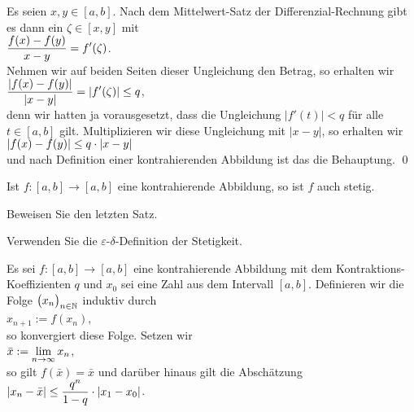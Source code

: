 \proof
Es seien $x, y \in [a,b]$.
Nach dem Mittelwert-Satz der Differenzial-Rechnung gibt es dann ein $\zeta\in[x,y]$ mit 
\\[0.2cm]
\hspace*{1.3cm}
$\displaystyle\frac{f(x) - f(y)}{x - y} = f'(\zeta)$.
\\[0.2cm]
Nehmen wir auf beiden Seiten dieser Ungleichung den Betrag, so erhalten wir
\\[0.2cm]
\hspace*{1.3cm}
$\displaystyle\frac{|f(x) - f(y)|}{|x - y|} = |f'(\zeta)| \leq q$,
\\[0.2cm]
denn wir hatten ja vorausgesetzt, dass die Ungleichung $|f'(t)| < q$ f\"ur alle
$t \in [a,b]$ gilt.  Multiplizieren wir diese Ungleichung mit $|x - y|$, so erhalten wir
\\[0.2cm]
\hspace*{1.3cm}
$\displaystyle |f(x) - f(y)| \leq q \cdot |x  - y|$
\\[0.2cm]
und nach Definition einer kontrahierenden Abbildung ist das die Behauptung.
\qed

\begin{Satz}
  Ist $f:[a,b] \rightarrow [a,b]$ eine kontrahierende Abbildung, so ist $f$ auch stetig.
\end{Satz}

\exercise
Beweisen Sie den letzten Satz.

\hint
Verwenden Sie die $\varepsilon$-$\delta$-Definition der Stetigkeit.
\eox

\begin{Satz} \lb
Es sei $f:[a,b] \rightarrow [a,b]$ eine kontrahierende Abbildung mit dem
Kontraktions-Koeffizienten $q$ und $x_0$ sei eine Zahl aus dem Intervall $[a,b]$.  
Definieren wir die Folge $\bigl(x_n\bigr)_{n\in\mathbb{N}}$ induktiv durch
\\[0.2cm]
\hspace*{1.3cm} $x_{n+1} := f(x_n)$,
\\[0.2cm]
so konvergiert diese Folge.  Setzen wir 
\\[0.2cm]
\hspace*{1.3cm}
$\displaystyle\bar{x} := \lim\limits_{n\rightarrow\infty} x_n$,
\\[0.2cm]
so gilt $f(\bar{x}) = \bar{x}$ und dar\"uber hinaus gilt die Absch\"atzung 
\\[0.2cm]
\hspace*{1.3cm}
$\displaystyle |x_n - \bar{x}| \leq \frac{q^n}{1- q} \cdot  |x_1 - x_0|$.
\end{Satz}

